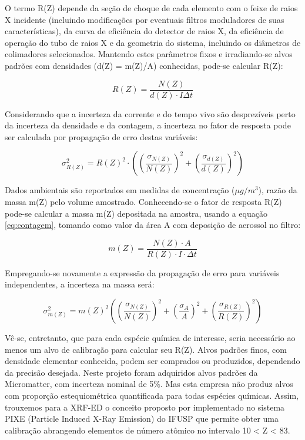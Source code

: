 O termo R(Z) depende da seção de choque de cada elemento com o feixe de 
raios X incidente (incluindo modificações por eventuais filtros moduladores 
de suas características), da curva de eficiência do detector de raios X, 
da eficiência de operação do tubo de raios X e da geometria do sistema, 
incluindo os diâmetros de colimadores selecionados. Mantendo estes parâmetros 
fixos e irradiando-se alvos padrões com densidades (d(Z) = m(Z)/A) 
conhecidas, pode-se calcular R(Z):

\begin{equation}
  \label{eq:fator_de_resposta}
  R(Z) = \frac{N(Z)}{d(Z) \cdot I \Delta t}
\end{equation}

Considerando que a incerteza da corrente e do tempo vivo são desprezíveis 
perto da incerteza da densidade e da contagem, a incerteza no fator de resposta
pode ser calculada por propagação de erro destas variáveis:

\begin{equation}
  \label{eq:erro_fator_de_resposta}
  \sigma_{R(Z)}^2 = {R(Z)}^2 \cdot \left( \left(\frac{\sigma_{N(Z)}}{N(Z)}\right)^2 + 
                                      \left(\frac{\sigma_{d(Z)}}{d(Z)}\right)^2 
                                   \right)
\end{equation}

Dados ambientais são reportados em medidas de concentração ($\mu g/m^3$),
razão da massa m(Z) pelo volume amostrado. Conhecendo-se o fator de resposta 
R(Z) pode-se calcular a massa m(Z) depositada na amostra, usando a equação 
\ref{eq:contagem}, tomando como valor da área A com deposição de aerossol
no filtro:

\begin{equation}
  \label{eq:xrfedmassa}
  m(Z) = \frac{N(Z) \cdot A}{ R(Z) \cdot I \cdot \Delta t}
\end{equation}

Empregando-se novamente a expressão da propagação de erro para variáveis 
independentes, a incerteza na massa será:

\begin{equation}
  \label{eq:erro_massa}
  \sigma_{m(Z)}^2 = {m(Z)}^2 \left( \left(\frac{\sigma_{N(Z)}}{N(Z)}\right)^2 + 
                                  \left(\frac{\sigma_A}{A}\right)^2 + 
                                  \left(\frac{\sigma_{R(Z)}}{R(Z)}\right)^2 
                             \right)
\end{equation}


Vê-se, entretanto, que para cada espécie química de interesse, seria necessário
ao menos um alvo de calibração para calcular seu R(Z). Alvos padrões finos, 
com densidade elementar conhecida, podem ser comprados ou produzidos, dependendo
da precisão desejada. Neste projeto foram adquiridos alvos padrões da 
Micromatter, com incerteza nominal de 5\%. Mas esta empresa não produz alvos 
com proporção estequiométrica quantificada para todas espécies químicas.
Assim, trouxemos para a XRF-ED o conceito proposto por \citet{tabacniks2000}
implementado no sistema PIXE (Particle Induced X-Ray Emission) do IFUSP que permite obter uma 
calibração abrangendo elementos de número atômico no intervalo 10 < Z < 83. 
 

